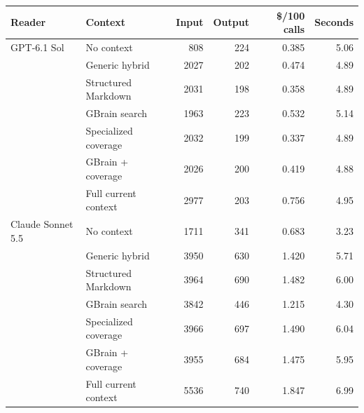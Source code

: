 \begin{tabular}{llrrrr}
\toprule
Reader & Context & Input & Output & \$/100 calls & Seconds \\
\midrule
GPT-6.1 Sol & No context & 808 & 224 & 0.385 & 5.06 \\
 & Generic hybrid & 2027 & 202 & 0.474 & 4.89 \\
 & Structured Markdown & 2031 & 198 & 0.358 & 4.89 \\
 & GBrain search & 1963 & 223 & 0.532 & 5.14 \\
 & Specialized coverage & 2032 & 199 & 0.337 & 4.89 \\
 & GBrain + coverage & 2026 & 200 & 0.419 & 4.88 \\
 & Full current context & 2977 & 203 & 0.756 & 4.95 \\
\midrule
Claude Sonnet 5.5 & No context & 1711 & 341 & 0.683 & 3.23 \\
 & Generic hybrid & 3950 & 630 & 1.420 & 5.71 \\
 & Structured Markdown & 3964 & 690 & 1.482 & 6.00 \\
 & GBrain search & 3842 & 446 & 1.215 & 4.30 \\
 & Specialized coverage & 3966 & 697 & 1.490 & 6.04 \\
 & GBrain + coverage & 3955 & 684 & 1.475 & 5.95 \\
 & Full current context & 5536 & 740 & 1.847 & 6.99 \\
\bottomrule
\end{tabular}
